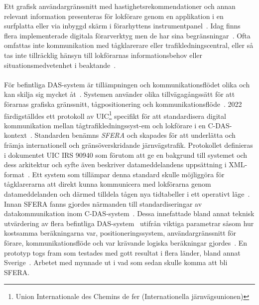 Ett grafisk användargränssnitt med hastighetsrekommendationer och annan relevant information presenteras för lokförare genom en applikation i en surfplatta eller via inbyggd skärm i förarhyttens instrumentpanel~\cite{Bae2014, Kamenicky2016, Konstantinos2013, Cwil2018, Tschirner2013, Yang2013, Joborn2023, Lindmark2022, Angel2020}.
Idag finns flera implementerade digitala förarverktyg men de har sina begränsningar~\cite{Bae2014}.
Ofta omfattas inte kommunikation med tågklarerare eller trafikledningscentral, eller så tas inte tillräcklig hänsyn till lokförarnas informationsbehov eller situationsmedvetenhet i beaktande~\cite{Bae2014, Joborn2023, Tschirner2013}.
\paragraph{}
\hspace{-12pt}
För befintliga DAS-system är tillämpningen och kommunikationsflödet olika och kan skilja sig mycket åt~\cite{Konstantinos2013}.
Systemen använder olika tillvägagångssätt för att förarnas grafiska gränssnitt, tågpositionering och kommunikationsflöde~\cite{Konstantinos2013}.
2022 färdigställdes ett protokoll av UIC\footnote{Union Internationale des Chemins de fer (Internationella järnvägsunionen)} specifikt för att standardisera digital kommunikation mellan tågtrafikledningssyst-em och lokförare i en C-DAS-kontext~\cite{Joborn2023, Olsson2023, Lindmark2022}.
Standarden benämns \emph{SFERA} och skapades för att underlätta och främja internationell och gränsöverskridande järnvägstrafik\cite{IRS90940}.
Protokollet definieras i dokumentet UIC IRS 90940 som förutom att ge en bakgrund till systemet och dess arkitektur och syfte även beskriver datameddelandens uppsättning i XML-format~\cite{Joborn2023, IRS90940}.
Ett system som tillämpar denna standard skulle möjliggöra för tågklarerarna att direkt kunna kommunicera med lokförarna genom datameddelanden och därmed tilldela tågen nya tidtabeller i ett operativt läge~\cite{Angel2020, Joborn2023, Lindmark2022, Olsson2023}.
Innan SFERA fanns gjordes närmanden till standardiseringar av datakommunikation inom C-DAS-system~\cite{Quaglietta2015, Konstantinos2013}.
Dessa innefattade bland annat teknisk utvärdering av flera befintliga DAS-system~\cite{Konstantinos2013} utifrån viktiga parametrar såsom hur kostsamma beräkningarna var, positioneringssystem, användargränssnitt för förare, kommunikationsflöde och var krävande logiska beräkningar gjordes~\cite{Konstantinos2013}.
En prototyp togs fram som testades med gott resultat i flera länder, bland annat Sverige~\cite{Quaglietta2015}.
Arbetet med mynnade ut i vad som sedan skulle komma att bli SFERA\@.
